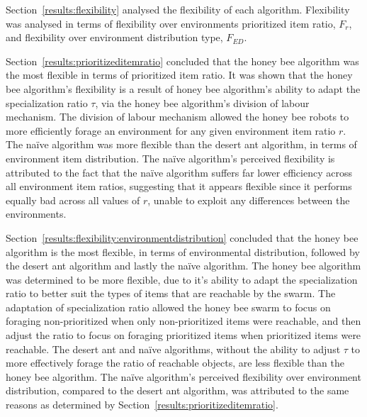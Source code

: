 Section~\ref{results:flexibility} analysed the flexibility of each algorithm. Flexibility was analysed in terms of flexibility over environments prioritized item ratio, $F_r$, and flexibility over environment distribution type, $F_{ED}$. 

Section~\ref{results:prioritizeditemratio} concluded that the honey bee algorithm was the most flexible in terms of prioritized item ratio. It was shown that the honey bee algorithm's flexibility is a result of honey bee algorithm's ability to adapt the specialization ratio $\tau$, via the honey bee algorithm's division of labour mechanism. The division of labour mechanism allowed the honey bee robots to more efficiently forage an environment for any given environment item ratio $r$. The na\"ive algorithm was more flexible than the desert ant algorithm, in terms of environment item distribution. The na\"ive algorithm's perceived flexibility is attributed to the fact that the na\"ive algorithm suffers far lower efficiency across all environment item ratios, suggesting that it appears flexible since it performs equally bad across all values of $r$, unable to exploit any differences between the environments. 

Section~\ref{results:flexibility:environmentdistribution} concluded that the honey bee algorithm is the most flexible, in terms of environmental distribution, followed by the desert ant algorithm and lastly the na\"ive algorithm. The honey bee algorithm was determined to be more flexible, due to it's ability to adapt the specialization ratio to better suit the types of items that are reachable by the swarm. The adaptation of specialization ratio allowed the honey bee swarm to focus on foraging non-prioritized when only non-prioritized items were reachable, and then adjust the ratio to focus on foraging prioritized items when prioritized items were reachable. The desert ant and na\"ive algorithms, without the ability to adjust $\tau$ to more effectively forage the ratio of reachable objects, are less flexible than the honey bee algorithm.
  The na\"ive algorithm's perceived flexibility over environment distribution, compared to the desert ant algorithm, was attributed to the same reasons as determined by Section~\ref{results:prioritizeditemratio}. 
  
